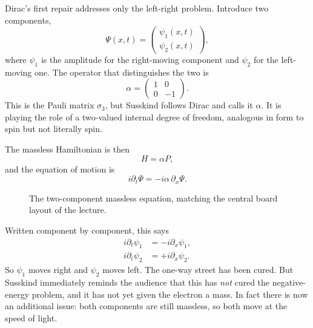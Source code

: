 Dirac's first repair addresses only the left-right problem. Introduce two components,
\begin{equation}
\Psi(x,t)=
\begin{pmatrix}
\psi_1(x,t)\\[4pt]
\psi_2(x,t)
\end{pmatrix},
\end{equation}
where \(\psi_1\) is the amplitude for the right-moving component and \(\psi_2\) for the left-moving one. The operator that distinguishes the two is
\begin{equation}
\alpha=
\begin{pmatrix}
1&0\\
0&-1
\end{pmatrix}.
\end{equation}
This is the Pauli matrix \(\sigma_3\), but Susskind follows Dirac and calls it \(\alpha\). It is playing the role of a two-valued internal degree of freedom, analogous in form to spin but not literally spin.

The massless Hamiltonian is then
\begin{equation}
H=\alpha P,
\end{equation}
and the equation of motion is
\begin{equation}
i\partial_t\Psi=-i\alpha\,\partial_x\Psi.
\end{equation}

\begin{figure}
\centering
{}
\caption{The two-component massless equation, matching the central board layout of the lecture.}
\end{figure}

Written component by component, this says
\begin{align}
i\partial_t\psi_1&=-i\partial_x\psi_1,
\\
i\partial_t\psi_2&=+i\partial_x\psi_2.
\end{align}
So \(\psi_1\) moves right and \(\psi_2\) moves left. The one-way street has been cured. But Susskind immediately reminds the audience that this has \emph{not} cured the negative-energy problem, and it has not yet given the electron a mass. In fact there is now an additional issue: both components are still massless, so both move at the speed of light.

